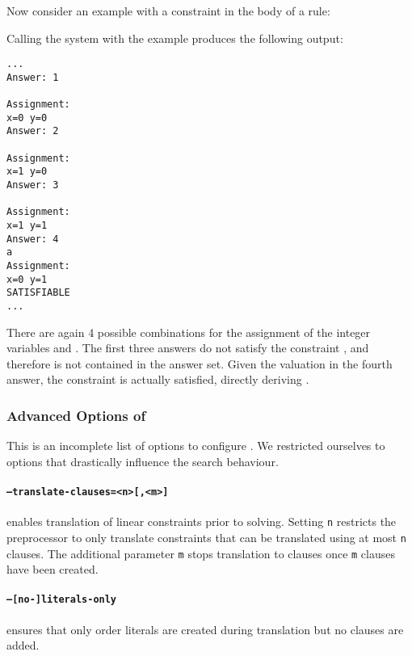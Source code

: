 \begin{example}\label{ex:lp:csp3}
Now consider an example with a constraint in the body of a rule: 

Calling the system with the example produces the following output:
\begin{lstlisting}[numbers=none]
...
Answer: 1

Assignment:
x=0 y=0
Answer: 2

Assignment:
x=1 y=0
Answer: 3

Assignment:
x=1 y=1
Answer: 4
a
Assignment:
x=0 y=1
SATISFIABLE
...
\end{lstlisting}
There are again 4 possible combinations for the assignment of the integer variables  and .
The first three answers do not satisfy the constraint , and therefore  is not contained in the answer set.
Given the valuation in the fourth answer,
the constraint is actually satisfied, directly deriving .
\end{example}

\subsubsection{Advanced Options of \clingcon}\label{sec:clingcon:advanced}

This is an incomplete list of options to configure \clingcon.
We restricted ourselves to options that drastically influence the search behaviour.

\paragraph{\texttt{--translate-clauses=<n>[,<m>]}} enables translation of linear constraints prior to solving.
Setting \texttt{n} restricts the preprocessor to only translate constraints that can be translated using at most \texttt{n} clauses.
The additional parameter \texttt{m} stops translation to clauses once \texttt{m} clauses have been created.

\paragraph{\texttt{--[no-]literals-only}} ensures that only order literals are created during translation but no clauses are added.

